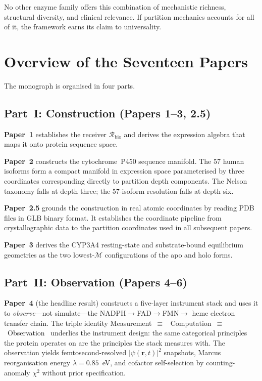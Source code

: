 \documentclass[11pt,twocolumn,a4paper]{article}
\theoremstyle{definition}
\theoremstyle{remark}
\newcommand{\Depth}{\mathcal{M}}
\newcommand{\Recv}{\mathcal{R}}
\begin{document}
No other enzyme family offers this combination of mechanistic richness,
structural diversity, and clinical relevance.  If partition mechanics accounts
for all of it, the framework earns its claim to universality.

\section{Overview of the Seventeen Papers}
\label{sec:overview}

The monograph is organised in four parts.

\subsection{Part~I: Construction (Papers 1--3, 2.5)}

\textbf{Paper~1} establishes the receiver $\Recv_{\mathrm{bio}}$ and derives
the expression algebra that maps it onto protein sequence space.

\textbf{Paper~2} constructs the cytochrome~P450 sequence manifold.  The 57
human isoforms form a compact manifold in expression space parameterised by
three coordinates corresponding directly to partition depth components.  The
Nelson taxonomy falls at depth three; the 57-isoform resolution falls at
depth six.

\textbf{Paper~2.5} grounds the construction in real atomic coordinates by
reading PDB files in GLB binary format.  It establishes the coordinate pipeline
from crystallographic data to the partition coordinates used in all subsequent
papers.

\textbf{Paper~3} derives the CYP3A4 resting-state and substrate-bound
equilibrium geometries as the two lowest-$\Depth$ configurations of the apo
and holo forms.

\subsection{Part~II: Observation (Papers 4--6)}

\textbf{Paper~4} (the headline result) constructs a five-layer instrument stack
and uses it to \emph{observe}---not simulate---the NADPH$\to$FAD$\to$FMN$\to$%
heme electron transfer chain.  The triple identity Measurement~$\equiv$~%
Computation~$\equiv$~Observation~\citep{sachikonye2025_atomicspec} underlies
the instrument design: the same categorical principles the protein operates on
are the principles the stack measures with.  The observation yields
femtosecond-resolved $|\psi(\mathbf{r},t)|^2$ snapshots, Marcus reorganisation
energy $\lambda = 0.85$~eV, and cofactor self-selection by counting-anomaly
$\chi^2$ without prior specification.
\end{document}
